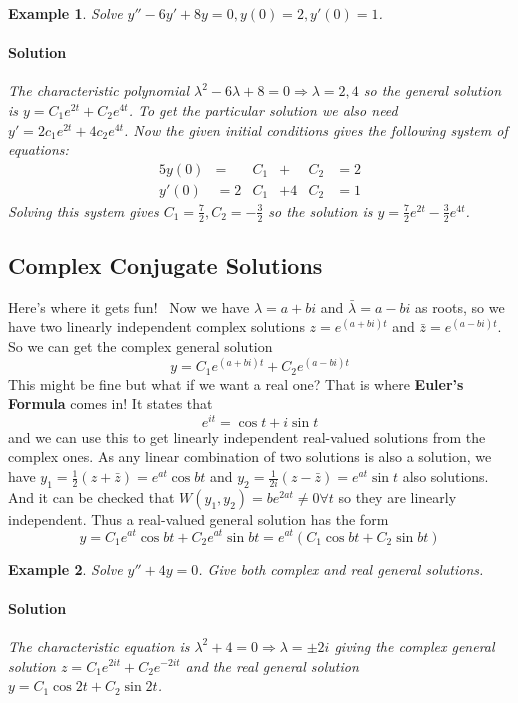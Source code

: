 \documentclass[letterpaper, 11pt, openany]{book}
\theoremstyle{mytheoremstyle}
\theoremstyle{myexamplestyle}
\newtheorem{example}{Example}[section]
\newenvironment{solution}{\paragraph{\sffamily \smaller \fontseries{b}\selectfont Solution}}{\hfill\faSquare}
\begin{document}
\begin{example}\label{e:de-2o-hcc-ivp}
    Solve \(y'' - 6y' + 8y = 0, y(0) = 2, y'(0) = 1\).
    \begin{solution}
        The characteristic polynomial \(\lambda^{2} -6\lambda + 8 = 0 \Rightarrow \lambda = 2,4\) so the general solution is \(y = C_{1} e^{2t} + C_{2} e^{4t}\). To get the particular solution we also need \(y' = 2c_{1} e^{2t} + 4c_2 e^{4t}\). Now the given initial conditions gives the following system of equations:
        \begin{alignat*}{5}
            y(0) &= &C_{1} &+ &C_{2} &= 2\\
            y'(0) &= 2&C_{1}&+ 4&C_{2} &= 1
        \end{alignat*}
        Solving this system gives \(C_{1} = \frac{7}{2}, C_{2} = -\frac{3}{2}\) so the solution is \(y = \frac{7}{2} e^{2t} -\frac{3}{2} e^{4t}\).
    \end{solution}
\end{example}

\subsection{Complex Conjugate Solutions}

Here's where it gets fun! \faSmile \, Now we have \(\lambda = a + bi\) and \(\bar{\lambda} = a - bi\) as roots, so we have two linearly independent complex solutions \(z = e^{(a+bi)t}\) and \(\bar{z} = e^{(a-bi)t}\). So we can get the complex general solution
\[y = C_{1} e^{(a+bi)t} + C_{2}e^{(a-bi)t}\]
This might be fine but what if we want a real one? That is where \textbf{Euler's Formula} comes in! It states that 
\[e^{it} = \cos t + i \sin t\]
and we can use this to get linearly independent real-valued solutions from the complex ones. As any linear combination of two solutions is also a solution, we have \(y_{1} = \frac{1}{2}\left(z + \bar{z}\right) = e^{at}\cos bt\) and \(y_{2} = \frac{1}{2i}\left(z - \bar{z}\right) = e^{at}\sin t\) also solutions. And it can be checked that \(W(y_{1}, y_{2}) = b e^{2at} \neq 0 \forall t\) so they are linearly independent. Thus a real-valued general solution has the form
\[y = C_{1} e^{at}\cos bt + C_{2} e^{at}\sin bt = e^{at} \left(C_{1}\cos bt + C_{2}\sin bt\right)\]

\begin{example}
    Solve \(y'' + 4y = 0\). Give both complex and real general solutions.
    \begin{solution}
        The characteristic equation is \(\lambda^{2} + 4 = 0 \Rightarrow \lambda = \pm 2i\) giving the complex general solution \(z = C_{1} e^{2it} + C_{2} e^{-2it}\) and the real general solution \(y = C_{1} \cos 2t + C_{2} \sin 2t\).
    \end{solution}
\end{example}
\end{document}
